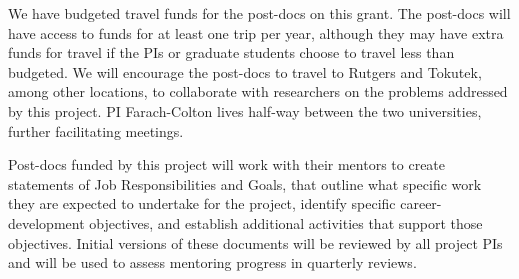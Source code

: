 We have budgeted travel funds for the post-docs on this grant.  The
post-docs will have access to funds for at least one trip per year,
although they may have extra funds for travel if the PIs or graduate
students choose to travel less than budgeted.  We will encourage the
post-docs to travel to Rutgers and Tokutek, among other locations, to
collaborate with researchers on the problems addressed by this
project.  PI Farach-Colton lives half-way between the two
universities, further facilitating meetings.

Post-docs funded by this project will work with their mentors to create
statements of Job Responsibilities and Goals, that outline what
specific work they are expected to undertake for the project, identify
specific career-development objectives, and establish additional
activities that support those objectives. Initial versions of these
documents will be reviewed by all project PIs and will be used to
assess mentoring progress in quarterly reviews.
